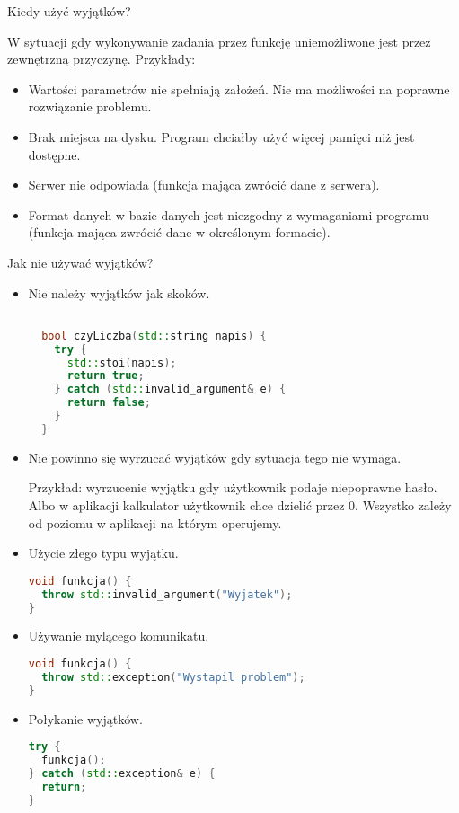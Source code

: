\documentclass[notheorems, aspectratio=54]{beamer}
\begin{document}
\begin{frame}

Kiedy użyć wyjątków?

W sytuacji gdy wykonywanie zadania przez funkcję uniemożliwone jest przez zewnętrzną przyczynę. Przykłady:

\begin{itemize}
\item Wartości parametrów nie spełniają założeń. Nie ma możliwości na poprawne rozwiązanie problemu.
\item Brak miejsca na dysku. Program chciałby użyć więcej pamięci niż jest dostępne.
\item Serwer nie odpowiada (funkcja mająca zwrócić dane z serwera).
\item Format danych w bazie danych jest niezgodny z wymaganiami programu (funkcja mająca zwrócić dane w określonym formacie).
\end{itemize}

\end{frame}
\begin{frame}

Jak nie używać wyjątków?

\begin{itemize}
\item Nie należy wyjątków jak skoków.

\begin{lstlisting}[language=C++]

  bool czyLiczba(std::string napis) {
    try {
      std::stoi(napis);
      return true;
    } catch (std::invalid_argument& e) {
      return false;
    }
  }
\end{lstlisting}
  
\item Nie powinno się wyrzucać wyjątków gdy sytuacja tego nie wymaga.

Przykład: wyrzucenie wyjątku gdy użytkownik podaje niepoprawne hasło.
Albo w aplikacji kalkulator użytkownik chce dzielić przez 0.
Wszystko zależy od poziomu w aplikacji na którym operujemy.

\item Użycie złego typu wyjątku.

\begin{lstlisting}[language=C++]
void funkcja() {
  throw std::invalid_argument("Wyjatek");
}
\end{lstlisting}

\item Używanie mylącego komunikatu.

\begin{lstlisting}[language=C++]
void funkcja() {
  throw std::exception("Wystapil problem");
}
\end{lstlisting}

\item Połykanie wyjątków.

\begin{lstlisting}[language=C++]
try {
  funkcja();
} catch (std::exception& e) {
  return;
}
\end{lstlisting}

\end{itemize}

\end{frame}
\end{document}
